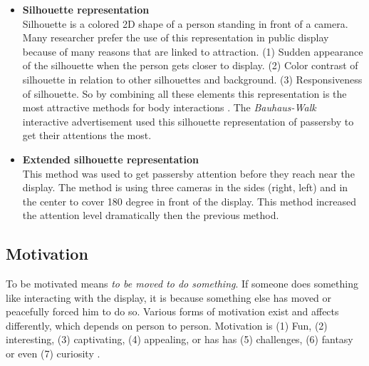 \begin{itemize}

\item \textbf{Silhouette representation} \\
Silhouette is a colored 2D shape of a person standing in front of a camera. Many researcher prefer the use of this representation in public display because of many reasons that are linked to attraction. (1) Sudden appearance of the silhouette when the person gets closer to display. (2) Color contrast of silhouette in relation to other silhouettes and background. (3) Responsiveness of silhouette.  So by combining all these elements this representation is the most attractive methods for body interactions \cite{LookingGlass}. The \emph{Bauhaus-Walk} interactive advertisement used this silhouette representation of passersby to get their attentions the most.


\item \textbf{Extended silhouette representation} \\
This method was used to get passersby attention before they reach near the display. The method is using three cameras in the sides (right, left) and in the center to cover 180 degree in front of the display. This method increased the attention level dramatically then the previous method.


\end{itemize}

\subsection{Motivation}
To be motivated means \emph{to be moved to do something}\cite{motiv}. If someone does something like interacting with the display, it is because something else has moved or peacefully forced him to do so. Various forms of motivation exist and affects differently, which depends on person to person. Motivation is (1) Fun, (2) interesting, (3) captivating, (4) appealing, or has has (5) challenges, (6) fantasy or even (7) curiosity \cite{toward_motivation}. 

